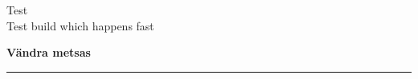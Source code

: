 \documentclass[12pt]{extbook}
\begin{document}
\rmfamily

\begin{titlepage}
  \null
  \begin{center}
    \vspace{1.5in}
    {\LARGE Test }\\
    { Test build which happens fast }
    \vfill
  \end{center}
\end{titlepage}

\clearpage
{
  \samepage
  \raggedbottom
  \raggedright
  \sloppy


  \vspace{0.2in}
    \centerline{
      \bfseries
      \large V\"andra metsas
    }
  \nopagebreak[4]
  \vspace{0.1in}
  \nopagebreak[4]
  \hrule height 0.05ex
  \nopagebreak[4]
  \vspace{-0.05in}



  \nopagebreak[4]
  {%
\parindent 0pt
\noindent
\ifx\preLilyPondExample \undefined
\else
  \expandafter\preLilyPondExample
\fi
\def\lilypondbook{}%

\ifx\postLilyPondExample \undefined
\else
  \expandafter\postLilyPondExample
\fi
}
  \vspace{-0.1in}

}
\end{document}
